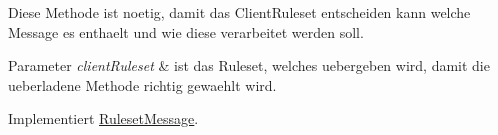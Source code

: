 Diese Methode ist noetig, damit das Client\-Ruleset entscheiden kann welche Message es enthaelt und wie diese verarbeitet werden soll. 


\begin{DoxyParams}{Parameter}
{\em client\-Ruleset} & ist das Ruleset, welches uebergeben wird, damit die ueberladene Methode richtig gewaehlt wird. \\
\hline
\end{DoxyParams}


Implementiert \hyperlink{a00053_acb5be722a2d1c9110d39f31c6e18f6e7}{Ruleset\-Message}.

